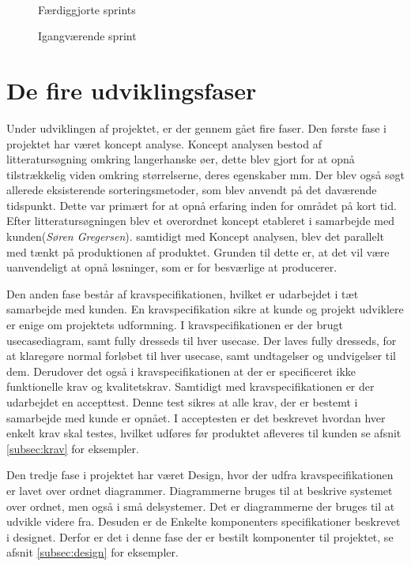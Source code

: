 \begin{figure}[htbp]
\begin{minipage}[b]{0.48\textwidth}
\end{minipage} \\ %
\begin{minipage}[t]{0.48\textwidth}
\caption{Færdiggjorte sprints} %
\label{fig:pt_sprints}
\end{minipage} \hfill
\begin{minipage}[t]{0.48\textwidth}
\caption{Igangværende sprint} %
\label{fig:pt_currentsprint}
\end{minipage}
\end{figure}

\section{De fire udviklingsfaser}
Under udviklingen af projektet, er der gennem gået fire faser. Den første fase i projektet har været koncept analyse. Koncept analysen bestod af litteratursøgning omkring langerhanske øer, dette blev gjort for at opnå tilstrækkelig viden omkring størrelserne, deres egenskaber mm. Der blev også søgt allerede eksisterende sorteringsmetoder, som blev anvendt på det daværende tidspunkt. Dette var primært for at opnå erfaring inden for området på kort tid. Efter litteratursøgningen blev et overordnet koncept etableret i samarbejde med kunden(\textit{Søren Gregersen}). samtidigt med Koncept analysen, blev det parallelt med tænkt på produktionen af produktet. Grunden til dette er, at det vil være uanvendeligt at opnå løsninger, som er for besværlige at producerer. 

Den anden fase består af kravspecifikationen, hvilket er udarbejdet i tæt samarbejde med kunden. En kravspecifikation sikre at kunde og projekt udviklere er enige om projektets udformning. I kravspecifikationen er der brugt usecasediagram, samt fully dresseds til hver usecase. Der laves fully dresseds, for at klaregøre normal forløbet til hver usecase, samt undtagelser og undvigelser til dem. Derudover det også i kravspecifikationen at der er specificeret ikke funktionelle krav og kvalitetskrav. Samtidigt med kravspecifikationen er der udarbejdet en accepttest. Denne test sikres at alle krav, der er bestemt i samarbejde med kunde er opnået. I acceptesten er det beskrevet hvordan hver enkelt krav skal testes, hvilket udføres før produktet afleveres til kunden se afsnit \ref{subsec:krav} for eksempler.

Den tredje fase i projektet har været Design, hvor der udfra kravspecifikationen er lavet over ordnet diagrammer. Diagrammerne bruges til at beskrive systemet over ordnet, men også i små delsystemer. Det er diagrammerne der bruges til at udvikle videre fra. Desuden er de Enkelte komponenters specifikationer beskrevet i designet. Derfor er det i denne fase der er bestilt komponenter til projektet, se afsnit \ref{subsec:design} for eksempler. 

